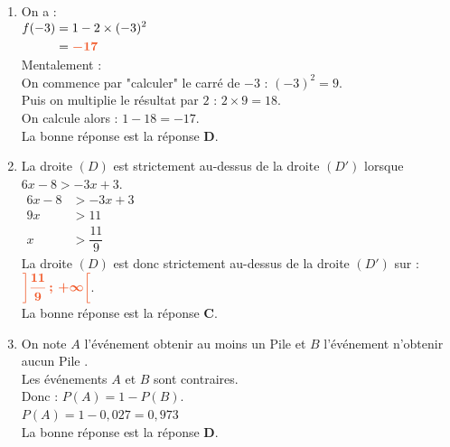 \documentclass[a4paper,11pt]{article}
\begin{document}
\begin{seance}{}
\begin{enumerate}
\item On a :\\
          $\begin{aligned}
          f(-3)&=1- 2\times (-3)^2\\
          &={\color[HTML]{F15929}\boldsymbol{-17}}
          \end{aligned}$\\{\color[HTML]{216D9A} Mentalement : \\
    On commence par "calculer" le carré de $-3$ :  $(-3)^2=9$.\\
    Puis on multiplie le résultat par $2$ : $2\times 9=18$.\\
    On calcule alors : $1-18=-17$.}\\La bonne réponse est la réponse {\bfseries \color[HTML]{F15929}D}.

\item La droite $(D)$ est strictement au-dessus de la droite $(D')$ lorsque $6x-8>-3x+3$.\\
     $\begin{aligned}
     6x-8&>-3x+3\\
     9x&>11\\
     x&>\dfrac{11}{9}
     \end{aligned}$\\
     La droite $(D)$ est donc strictement au-dessus de la droite $(D')$ sur : 
     ${\color[HTML]{F15929}\boldsymbol{\left]\dfrac{11}{9}\,;\, +\infty\right[}}$.\\La bonne réponse est la réponse {\bfseries \color[HTML]{F15929}C}.

\item On note $A$ l'événement \og{} obtenir au moins un Pile \fg{} et $B$ l'événement \og{} n'obtenir aucun Pile \fg{}.\\
Les événements $A$ et $B$ sont contraires.\\
Donc : $P(A) = 1 - P(B)$.\\
$P(A) = 1 - 0{,}027 = 0{,}973$\\La bonne réponse est la réponse {\bfseries \color[HTML]{F15929}D}.

\end{enumerate}

\end{seance}
\end{document}
